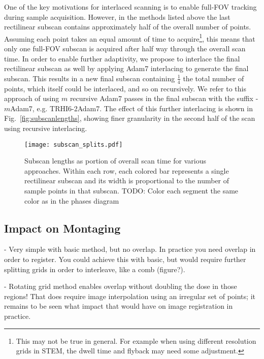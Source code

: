 \documentclass{article}
\newcommand{\reffig}[1]{Fig.~\ref{fig:#1}}
\begin{document}
One of the key motivations for interlaced scanning is to enable full-FOV tracking during sample acquisition.
%
However, in the methods listed above the last rectilinear subscan contains approximately half of the overall number of points.
%
Assuming each point takes an equal amount of time to acquire\footnote{This may not be true in general. For example when using different resolution grids in STEM, the dwell time and flyback may need some adjustment.}, this means that only one full-FOV subscan is acquired after half way through the overall scan time.
%
In order to enable further adaptivity, we propose to interlace the final rectilinear subscan as well by applying Adam7 interlacing to generate the final subscan.
%
This results in a new final subscan containing $\frac{1}{4}$ the total number of points, which itself could be interlaced, and so on recursively.
%
We refer to this approach of using $m$ recursive Adam7 passes in the final subscan with the suffix -$m$Adam7, e.g. TRHI6-2Adam7.
%
The effect of this further interlacing is shown in \reffig{subscanlengths}, showing finer granularity in the second half of the scan using recursive interlacing.


\begin{figure}
\centering
\texttt{[image: subscan\_splits.pdf]}
\caption{
\label{fig:subscansplits} 
Subscan lengths as portion of overall scan time for various approaches.
%
Within each row, each colored bar represents a single rectilinear subscan and its width is proportional to the number of sample points in that subscan.
%
TODO: Color each segment the same color as in the phases diagram
}
\end{figure}


\subsection{Impact on Montaging}
\label{sec:montaging}

- Very simple with basic method, but no overlap. In practice you need overlap in order to register. You could achieve this with basic, but would require further splitting grids in order to interleave, like a comb (figure?).

- Rotating grid method enables overlap without doubling the dose in those regions! That does require image interpolation using an irregular set of points; it remains to be seen what impact that would have on image registration in practice.
\end{document}
